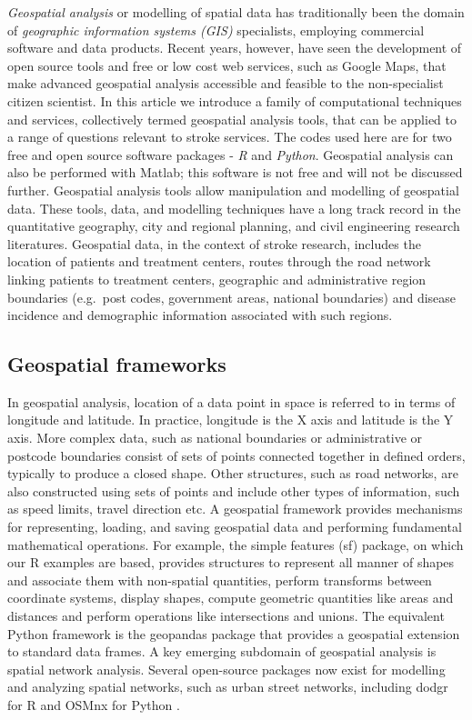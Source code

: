 \documentclass[utf8]{frontiersHLTH}
\begin{document}
{\em Geospatial analysis} or modelling of spatial data has
traditionally been the domain of {\em geographic information systems
  (GIS)} specialists, employing commercial software and data
products. Recent years, however, have seen the development of open
source tools and free or low cost web services, such as Google Maps,
that make advanced geospatial analysis accessible and feasible to the
non-specialist citizen scientist. In this article we introduce a
family of computational techniques and services, collectively termed
geospatial analysis tools, that can be applied to a range of questions
relevant to stroke services. The codes used here are for two free
and open source software packages - {\em R} and  {\em Python}. Geospatial analysis
can also be performed with Matlab\cite{Milne_2017}; this software is not free and
will not be discussed further. Geospatial analysis tools allow
manipulation and modelling of geospatial data. These tools, data, and
modelling techniques have a long track record in the quantitative
geography, city and regional planning, and civil engineering research
literatures. Geospatial data, in the context of stroke research,
includes the location of patients and treatment centers, routes
through the road network linking patients to treatment centers,
geographic and administrative region boundaries (e.g.~post codes,
government areas, national boundaries) and disease incidence and
demographic information associated with such regions.

\subsection{Geospatial frameworks}\label{geospatial-frameworks} 
In geospatial analysis, location of a data point in space is referred
to in terms of longitude and latitude. In practice, longitude is the X
axis and latitude is the Y axis. More complex data, such as national
boundaries or administrative or postcode boundaries consist of sets of
points connected together in defined orders, typically to produce a
closed shape. Other structures, such as road networks, are also
constructed using sets of points and include other types of
information, such as speed limits, travel direction etc. A geospatial
framework provides mechanisms for representing, loading, and saving
geospatial data and performing fundamental mathematical
operations. For example, the simple features (sf) \cite{Pebesma_2018}
package, on which our R examples are based, provides structures to
represent all manner of shapes and associate them with non-spatial
quantities, perform transforms between coordinate systems, display
shapes, compute geometric quantities like areas and distances and
perform operations like intersections and unions. The equivalent
Python framework is the geopandas package that provides a geospatial
extension to standard data frames. A key emerging subdomain of
geospatial analysis is spatial network analysis. Several open-source
packages now exist for modelling and analyzing spatial networks, such
as urban street networks, including dodgr for R \cite{Padgham_2019}
and OSMnx for Python \cite{boeing_osmnx_2017}.
\end{document}
